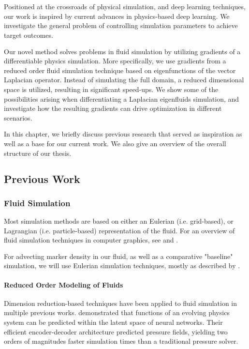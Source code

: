 \chapter{\bevezetes}

Positioned at the crossroads of physical simulation, and deep learning
techniques, our work is inspired by current advances in physics-based deep
learning. We investigate the general problem of controlling simulation
parameters to achieve target outcomes.

Our novel method solves problems in fluid simulation by utilizing gradients of
a differentiable physics simulation. More specifically, we use gradients from
a reduced order fluid simulation technique based on eigenfunctions of the vector
Laplacian operator. Instead of simulating the full domain, a reduced dimensional
space is utilized, resulting in significant speed-ups. We show some of the
possibilities arising when differentiating a Laplacian eigenfluids simulation,
and investigate how the resulting gradients can drive optimization in different
scenarios.

In this chapter, we briefly discuss previous research that served as inspiration
as well as a base for our current work. We also give an overview of the overall
structure of our thesis. 

\section{Previous Work}
\subsection{Fluid Simulation}
Most simulation methods are based on either an Eulerian (i.e.  grid-based), or
Lagrangian (i.e. particle-based) representation of the fluid.  For an overview
of fluid simulation techniques in computer graphics, see \citet{FluidNotes} and
\citet{BridsonFluid}. 

For advecting marker density in our fluid, as well as a comparative "baseline"
simulation, we will use Eulerian simulation techniques, mostly as described by
\citet{StableFluids}.

\subsubsection*{Reduced Order Modeling of Fluids}
Dimension reduction-based techniques have been applied to fluid simulation in
multiple previous works. \citet{Wiewel2019LatentSP} demonstrated that functions
of an evolving physics system can be predicted within the latent space of neural
networks. Their efficient encoder-decoder architecture predicted pressure
fields, yielding two orders of magnitudes faster simulation times than
a traditional pressure solver.

